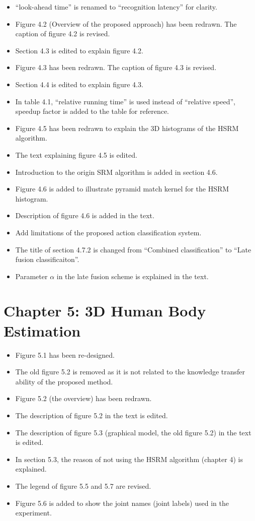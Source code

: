\documentclass[10pt, a4paper]{article}
\begin{document}
\begin{itemize}
\item ``look-ahead time'' is renamed to ``recognition latency'' for clarity.
\item Figure 4.2 (Overview of the proposed approach) has been redrawn. The caption of figure 4.2 is revised.
\item Section 4.3 is edited to explain figure 4.2.
\item Figure 4.3 has been redrawn. The caption of figure 4.3 is revised.
\item Section 4.4 is edited to explain figure 4.3.
\item In table 4.1,  ``relative running time'' is used instead of ``relative speed'', speedup factor is added to the table for reference.
\item Figure 4.5 has been redrawn to explain the 3D histograms of the HSRM algorithm.
\item The text explaining figure 4.5 is edited.
\item Introduction to the origin SRM algorithm \cite{Ryoo2009} is added in section 4.6.
\item Figure 4.6 is added to illustrate pyramid match kernel for the HSRM histogram.
\item Description of figure 4.6 is added in the text.  
\item Add limitations of the proposed action classification system.  
\item The title of section 4.7.2 is changed from ``Combined classification'' to ``Late fusion classificaiton''.
\item Parameter $\alpha$ in the late fusion scheme is explained in the text.
\end{itemize}

\section{Chapter 5: 3D Human Body Estimation}

\begin{itemize}
\item Figure 5.1 has been re-designed.
\item The old figure 5.2 is removed as it is not related to the knowledge transfer ability of the proposed method.
\item Figure 5.2 (the overview) has been redrawn.
\item The description of figure 5.2 in the text is edited.
\item The description of figure 5.3 (graphical model, the old figure 5.2) in the text is edited.
\item In section 5.3, the reason of not using the HSRM algorithm (chapter 4) is explained.
\item The legend of figure 5.5 and 5.7 are revised.
\item Figure 5.6 is added to show the joint names (joint labels) used in the experiment.
\end{itemize}
\end{document}
